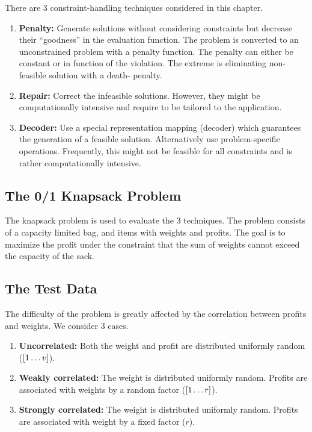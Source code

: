 \documentclass[../main.tex]{subfiles}
\begin{document}
\begin{mdframed}
\end{mdframed}

There are 3 constraint-handling techniques considered in this chapter.

\begin{enumerate}
	\item \textbf{Penalty:} Generate solutions without considering constraints but decrease their ``goodness'' in the
	evaluation function. The problem is converted to an unconstrained problem with a penalty function. The penalty can
	either be constant or in function of the violation. The extreme is eliminating non-feasible solution with a death-
	penalty.
	\item \textbf{Repair:} Correct the infeasible solutions. However, they might be computationally intensive and
	require to be tailored to the application.
	\item \textbf{Decoder:} Use a special representation mapping (decoder) which guarantees the generation of a
	feasible solution. Alternatively use problem-specific operations. Frequently, this might not be feasible for all
	constraints and is rather computationally intensive.
\end{enumerate}

\subsection{The 0/1 Knapsack Problem}

The knapsack problem is used to evaluate the 3 techniques. The problem consists of a capacity limited bag, and items
with weights and profits. The goal is to maximize the profit under the constraint that the sum of weights cannot exceed
the capacity of the sack.

\subsection{The Test Data}

The difficulty of the problem is greatly affected by the correlation between profits and weights. We consider 3 cases.

\begin{enumerate}
	\item \textbf{Uncorrelated:} Both the weight and profit are distributed uniformly random ($[1 \mathellipsis v]$).
	\item \textbf{Weakly correlated:} The weight is distributed uniformly random. Profits are associated with weights
	by a random factor ($[1 \mathellipsis r]$).
	\item \textbf{Strongly correlated:} The weight is distributed uniformly random. Profits are associated with weight
	by a fixed factor ($r$).
\end{enumerate}
\end{document}
